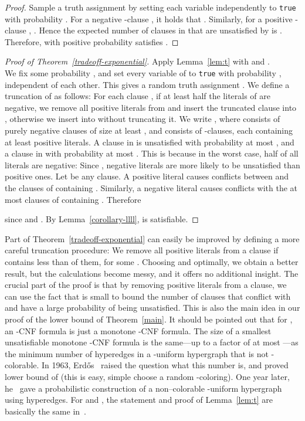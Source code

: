 \documentclass[a4paper, 11pt]{article}
\begin{document}
\begin{proof}
  Sample a truth assignment
   by setting each variable independently to \texttt{true}
  with probability . For a negative -clause , it holds
  that . Similarly, for a
  positive -clause , .  Hence the expected number of clauses in  that
  are unsatisfied by  is .
  Therefore, with positive probability  satisfies .
\end{proof}








\begin{proof}[Proof of Theorem~\ref{tradeoff-exponential}]
   Apply Lemma~\ref{lem:t} with  and .\\
  
   We fix some probability , and set every variable of  to \texttt{true} with
  probability , independent of each other. This gives a random
  truth assignment . We define a truncation  of  as
  follows: For each clause , if at least half the literals of
   are negative, we remove all positive literals from  and
  insert the truncated clause into , otherwise we insert  into
   without truncating it.  We write , where
   consists of purely negative clauses of size at least
  , and  consists of -clauses, each containing at
  least  positive literals.  A clause in  is
  unsatisfied with probability at most , and a clause
  in  with probability at most . This is because in the worst case, half of all
  literals are negative: Since , negative literals
  are more likely to be unsatisfied than positive ones.  Let  be any clause. A positive literal  causes conflicts
  between  and the  clauses
  of  containing . Similarly, a negative literal  causes conflicts with the at most  clauses of
   containing . Therefore
  
  since  and 
  .
  By Lemma~\ref{corollary-llll},  is satisfiable. 
\end{proof}

Part  of Theorem~\ref{tradeoff-exponential} can easily be improved
by defining a more careful truncation procedure: We remove all
positive literals from a clause  if  contains less than  of them, for some . Choosing  and 
optimally, we obtain a better result, but the calculations become
messy, and it offers no additional insight. The crucial part of the
proof is that by removing positive literals from a clause, we can use
the fact that  is small to bound the number of
clauses  that conflict with  and have a large probability of
being unsatisfied.  This is also the main idea in our proof of the
lower bound of Theorem~\ref{main}.
It should be pointed out that for , an -CNF
formula is just a monotone -CNF formula. The size of a smallest
unsatisfiable monotone -CNF formula is the same---up to a factor of
at most ---as the minimum number of hyperedges in a -uniform
hypergraph that is not -colorable. In 1963,
Erd\H{o}s~\cite{Erdos1963} raised the question what this number is,
and proved lower bound of  (this is easy, simple choose a
random -coloring). One year later, he~\cite{Erdos1964} gave a
probabilistic construction of a non--colorable -uniform
hypergraph using  hyperedges. For  and
, the statement and proof of Lemma~\ref{lem:t} are
basically the same in~\cite{Erdos1964}.
\end{document}
